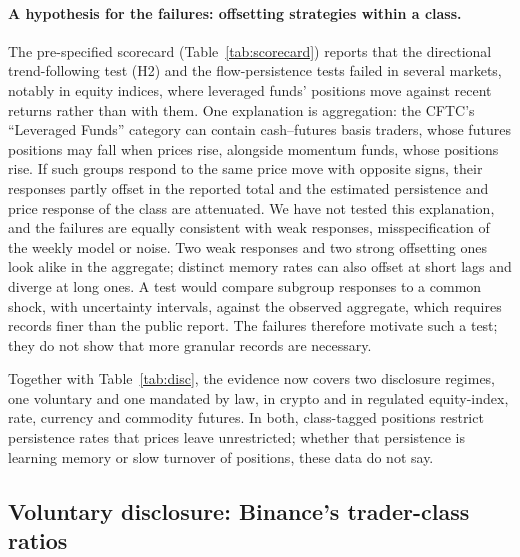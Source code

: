 \documentclass[12pt]{article}
\theoremstyle{definition}
\theoremstyle{remark}
\begin{document}
\paragraph{A hypothesis for the failures: offsetting strategies within a class.} The pre-specified scorecard (Table~\ref{tab:scorecard}) reports that the directional trend-following test (H2) and the flow-persistence tests failed in several markets, notably in equity indices, where leveraged funds' positions move against recent returns rather than with them. One explanation is aggregation: the CFTC's ``Leveraged Funds'' category can contain cash--futures basis traders, whose futures positions may fall when prices rise, alongside momentum funds, whose positions rise. If such groups respond to the same price move with opposite signs, their responses partly offset in the reported total and the estimated persistence and price response of the class are attenuated. We have not tested this explanation, and the failures are equally consistent with weak responses, misspecification of the weekly model or noise. Two weak responses and two strong offsetting ones look alike in the aggregate; distinct memory rates can also offset at short lags and diverge at long ones. A test would compare subgroup responses to a common shock, with uncertainty intervals, against the observed aggregate, which requires records finer than the public report. The failures therefore motivate such a test; they do not show that more granular records are necessary.

Together with Table~\ref{tab:disc}, the evidence now covers two disclosure regimes, one voluntary and one mandated by law, in crypto and in regulated equity-index, rate, currency and commodity futures. In both, class-tagged positions restrict persistence rates that prices leave unrestricted; whether that persistence is learning memory or slow turnover of positions, these data do not say.

\subsection{Voluntary disclosure: Binance's trader-class ratios}\label{sec:disc_data}
\end{document}

